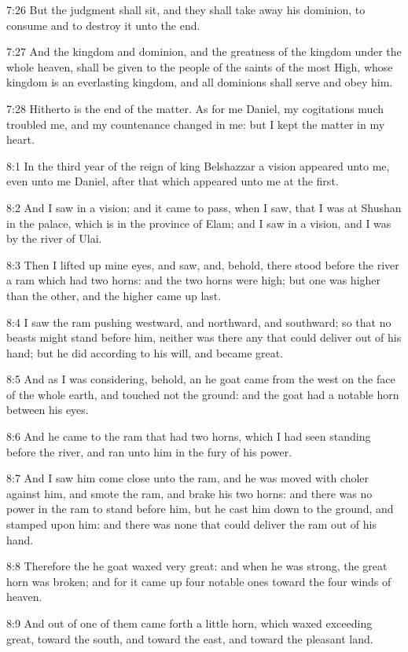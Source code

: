 7:26 But the judgment shall sit, and they shall take away his
dominion, to consume and to destroy it unto the end.

7:27 And the kingdom and dominion, and the greatness of the kingdom
under the whole heaven, shall be given to the people of the saints of
the most High, whose kingdom is an everlasting kingdom, and all
dominions shall serve and obey him.

7:28 Hitherto is the end of the matter. As for me Daniel, my
cogitations much troubled me, and my countenance changed in me: but I
kept the matter in my heart.

8:1 In the third year of the reign of king Belshazzar a vision
appeared unto me, even unto me Daniel, after that which appeared unto
me at the first.

8:2 And I saw in a vision; and it came to pass, when I saw, that I was
at Shushan in the palace, which is in the province of Elam; and I saw
in a vision, and I was by the river of Ulai.

8:3 Then I lifted up mine eyes, and saw, and, behold, there stood
before the river a ram which had two horns: and the two horns were
high; but one was higher than the other, and the higher came up last.

8:4 I saw the ram pushing westward, and northward, and southward; so
that no beasts might stand before him, neither was there any that
could deliver out of his hand; but he did according to his will, and
became great.

8:5 And as I was considering, behold, an he goat came from the west on
the face of the whole earth, and touched not the ground: and the goat
had a notable horn between his eyes.

8:6 And he came to the ram that had two horns, which I had seen
standing before the river, and ran unto him in the fury of his power.

8:7 And I saw him come close unto the ram, and he was moved with
choler against him, and smote the ram, and brake his two horns: and
there was no power in the ram to stand before him, but he cast him
down to the ground, and stamped upon him: and there was none that
could deliver the ram out of his hand.

8:8 Therefore the he goat waxed very great: and when he was strong,
the great horn was broken; and for it came up four notable ones toward
the four winds of heaven.

8:9 And out of one of them came forth a little horn, which waxed
exceeding great, toward the south, and toward the east, and toward the
pleasant land.

